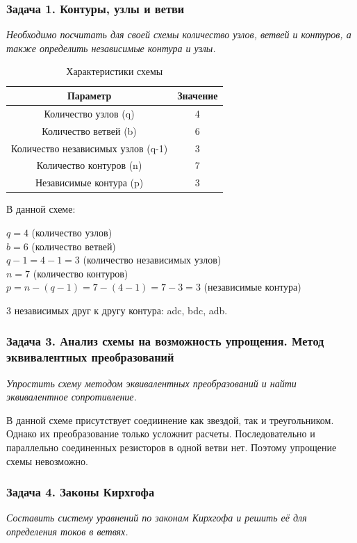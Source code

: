 \subsubsection{Задача 1. Контуры, узлы и ветви}
\textit{Необходимо посчитать для своей схемы количество узлов, ветвей и контуров, а также определить независимые контура и узлы.}
\begin{table}[H]
\centering
\begin{tabular}{|c|c|}
\hline
\textbf{Параметр} & \textbf{Значение} \\
\hline
Количество узлов (q) & 4 \\
\hline
Количество ветвей (b) & 6 \\
\hline
Количество независимых узлов (q-1) & 3 \\
\hline
Количество контуров (n) & 7 \\
\hline
Независимые контура (p) & 3 \\
\hline
\end{tabular}
\caption{Характеристики схемы}
\label{tab:circuit_characteristics}
\end{table}

В данной схеме:
\begin{flushleft}
$q = 4$ (количество узлов) \\
$b = 6$ (количество ветвей) \\
$q-1 = 4-1 = 3$ (количество независимых узлов) \\
$n = 7$ (количество контуров) \\
$p = n-(q-1) = 7-(4-1) = 7-3 = 3$ (независимые контура)
\end{flushleft}

3 независимых друг к другу контура: adc, bdc, adb.

\subsubsection{Задача 3. Анализ схемы на возможность упрощения. Метод эквивалентных преобразований}
\textit{Упростить схему методом эквивалентных преобразований и найти эквивалентное сопротивление.}

В данной схеме присутствует соедиинение как звездой, так и треугольником. Однако их преобразование только усложнит расчеты. Последовательно и параллельно соединенных резисторов в одной ветви нет. Поэтому упрощение схемы невозможно.


\subsubsection{Задача 4. Законы Кирхгофа}
\textit{Составить систему уравнений по законам Кирхгофа и решить её для определения токов в ветвях.}


